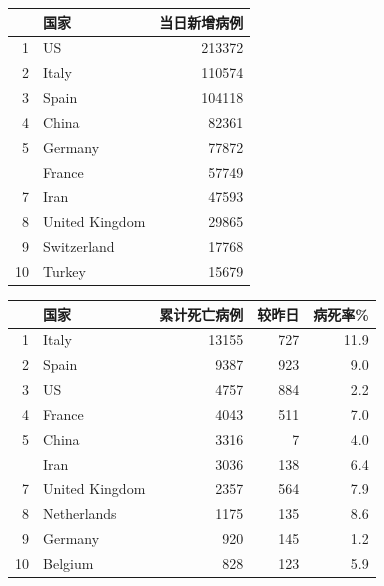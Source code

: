 \documentclass[]{article}
\begin{document}
\begin{table}[!htb]
    \begin{minipage}{.4\linewidth}
    \caption{确诊前十位国家}
      \centering \begin{table}[H]
\centering
\begin{tabular}{rlr}
\toprule
  & 国家 & 当⽇新增病例\\
\midrule
\rowcolor{gray!6}  1 & US & 213372\\
2 & Italy & 110574\\
\rowcolor{gray!6}  3 & Spain & 104118\\
4 & China & 82361\\
\rowcolor{gray!6}  5 & Germany & 77872\\
\addlinespace
6 & France & 57749\\
\rowcolor{gray!6}  7 & Iran & 47593\\
8 & United Kingdom & 29865\\
\rowcolor{gray!6}  9 & Switzerland & 17768\\
10 & Turkey & 15679\\
\bottomrule
\end{tabular}
\end{table} \end{minipage}%
    \begin{minipage}{.4\linewidth}
    \caption{累计死亡前十位国家}
      \centering \begin{table}[H]
\centering
\begin{tabular}{rlrrr}
\toprule
  & 国家 & 累计死亡病例 & 较昨⽇ & 病死率\%\\
\midrule
\rowcolor{gray!6}  1 & Italy & 13155 & 727 & 11.9\\
2 & Spain & 9387 & 923 & 9.0\\
\rowcolor{gray!6}  3 & US & 4757 & 884 & 2.2\\
4 & France & 4043 & 511 & 7.0\\
\rowcolor{gray!6}  5 & China & 3316 & 7 & 4.0\\
\addlinespace
6 & Iran & 3036 & 138 & 6.4\\
\rowcolor{gray!6}  7 & United Kingdom & 2357 & 564 & 7.9\\
8 & Netherlands & 1175 & 135 & 8.6\\
\rowcolor{gray!6}  9 & Germany & 920 & 145 & 1.2\\
10 & Belgium & 828 & 123 & 5.9\\
\bottomrule
\end{tabular}
\end{table} \end{minipage} 
\end{table}
\end{document}
